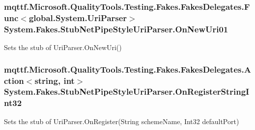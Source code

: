 \hypertarget{class_system_1_1_fakes_1_1_stub_net_pipe_style_uri_parser_a7543eab9e021b8cab9668339d37343a2}{
\subsubsection[{On\-New\-Uri01}]{\setlength{\rightskip}{0pt plus 5cm}mqttf.\-Microsoft.\-Quality\-Tools.\-Testing.\-Fakes.\-Fakes\-Delegates.\-Func$<$global.\-System.\-Uri\-Parser$>$ System.\-Fakes.\-Stub\-Net\-Pipe\-Style\-Uri\-Parser.\-On\-New\-Uri01}}\label{class_system_1_1_fakes_1_1_stub_net_pipe_style_uri_parser_a7543eab9e021b8cab9668339d37343a2}


Sets the stub of Uri\-Parser.\-On\-New\-Uri()

\hypertarget{class_system_1_1_fakes_1_1_stub_net_pipe_style_uri_parser_ae6a6c46c2223cfa4d263968279f012b3}{
\subsubsection[{On\-Register\-String\-Int32}]{\setlength{\rightskip}{0pt plus 5cm}mqttf.\-Microsoft.\-Quality\-Tools.\-Testing.\-Fakes.\-Fakes\-Delegates.\-Action$<$string, int$>$ System.\-Fakes.\-Stub\-Net\-Pipe\-Style\-Uri\-Parser.\-On\-Register\-String\-Int32}}\label{class_system_1_1_fakes_1_1_stub_net_pipe_style_uri_parser_ae6a6c46c2223cfa4d263968279f012b3}


Sets the stub of Uri\-Parser.\-On\-Register(\-String scheme\-Name, Int32 default\-Port)

